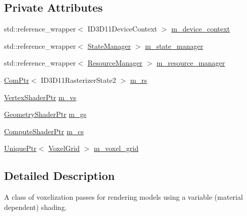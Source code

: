\subsection*{Private Attributes}
\begin{DoxyCompactItemize}
\item 
std\+::reference\+\_\+wrapper$<$ I\+D3\+D11\+Device\+Context $>$ \hyperlink{classmage_1_1rendering_1_1_voxelization_pass_a44fc5652aed364651c7f58db658fc951}{m\+\_\+device\+\_\+context}
\item 
std\+::reference\+\_\+wrapper$<$ \hyperlink{classmage_1_1rendering_1_1_state_manager}{State\+Manager} $>$ \hyperlink{classmage_1_1rendering_1_1_voxelization_pass_a449470bf0e0a246a2457b87289155330}{m\+\_\+state\+\_\+manager}
\item 
std\+::reference\+\_\+wrapper$<$ \hyperlink{classmage_1_1rendering_1_1_resource_manager}{Resource\+Manager} $>$ \hyperlink{classmage_1_1rendering_1_1_voxelization_pass_aadfa94217df7498078ae49effc6b438b}{m\+\_\+resource\+\_\+manager}
\item 
\hyperlink{namespacemage_ae74f374780900893caa5555d1031fd79}{Com\+Ptr}$<$ I\+D3\+D11\+Rasterizer\+State2 $>$ \hyperlink{classmage_1_1rendering_1_1_voxelization_pass_a0b92de6ef466e697204af0bc5907fcc8}{m\+\_\+rs}
\item 
\hyperlink{namespacemage_1_1rendering_aaf704b9c54a4181f4950a1761de69dda}{Vertex\+Shader\+Ptr} \hyperlink{classmage_1_1rendering_1_1_voxelization_pass_aa95ee5cba6cfdf82d115f080421aee1c}{m\+\_\+vs}
\item 
\hyperlink{namespacemage_1_1rendering_aa5d63f80f9483d0896718813768ba1cf}{Geometry\+Shader\+Ptr} \hyperlink{classmage_1_1rendering_1_1_voxelization_pass_ac6161a5ea8a4203c4026afecf90755d4}{m\+\_\+gs}
\item 
\hyperlink{namespacemage_1_1rendering_ab3dc9f2114f2e9255b91d9c051da52ea}{Compute\+Shader\+Ptr} \hyperlink{classmage_1_1rendering_1_1_voxelization_pass_ae3d844f54f0a3c1e2949b8cb38836eeb}{m\+\_\+cs}
\item 
\hyperlink{namespacemage_a3316d7143a973e37adf1110f2e80ca31}{Unique\+Ptr}$<$ \hyperlink{classmage_1_1rendering_1_1_voxel_grid}{Voxel\+Grid} $>$ \hyperlink{classmage_1_1rendering_1_1_voxelization_pass_a5263939327363598c9d628db79b3cc49}{m\+\_\+voxel\+\_\+grid}
\end{DoxyCompactItemize}


\subsection{Detailed Description}
A class of voxelization passes for rendering models using a variable (material dependent) shading. 

